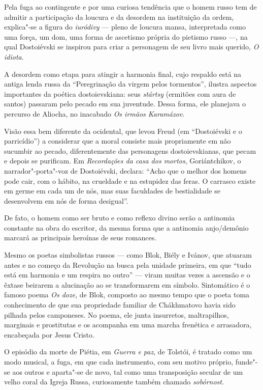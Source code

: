 Pela fuga ao contingente e por uma curiosa tendência que o homem russo
tem de admitir a participação da loucura e da desordem na instituição da
ordem, explica"-se a figura do \emph{iuródivy} --- pleno de loucura mansa,
interpretada como uma força, um dom, uma forma de ascetismo própria do
pietismo russo ---, na qual Dostoiévski se inspirou para criar a
personagem de seu livro mais querido, \emph{O idiota}.

A desordem como etapa para atingir a harmonia final, cujo respaldo está
na antiga lenda russa da ``Peregrinação da virgem pelos tormentos'',
ilustra aspectos importantes da poética dostoievskiana: seus
\emph{stártsy} (ermitões com aura de santos) passaram pelo pecado em sua
juventude. Dessa forma, ele planejava o percurso de Aliocha, no
inacabado \emph{Os irmãos Karamázov}.

Visão essa bem diferente da ocidental, que levou Freud
(em ``Dostoiévski e o parricídio'') a considerar que a moral consiste
mais propriamente em não sucumbir ao pecado, diferentemente das
personagens dostoievskianas, que pecam e depois se purificam.
Em \emph{Recordações da casa dos mortos}, Goriántchikov, o
narrador"-porta"-voz de Dostoiévski, declara: ``Acho que o melhor dos
homens pode cair, com o hábito, na crueldade e na estupidez das feras. O
carrasco existe em germe em cada um de nós, mas suas faculdades de
bestialidade se desenvolvem em nós de forma desigual''.

De fato, o homem como ser bruto e como reflexo divino serão a antinomia
constante na obra do escritor, da mesma forma que a antinomia
anjo/demônio marcará as principais heroínas de seus romances.

Mesmo os poetas simbolistas russos --- como Blok, Biély e Ivánov, que
atuaram antes e no começo da Revolução na busca pela unidade primeira,
em que ``tudo está em harmonia e um respira no outro'' --- viram muitas
vezes a ascensão e o êxtase beirarem a alucinação ao se transformarem em
símbolo. Sintomático é o famoso poema \emph{Os doze}, de Blok, composto
ao mesmo tempo que o poeta toma conhecimento de que sua propriedade
familiar de Chákhmatovo havia sido pilhada pelos camponeses. No poema,
ele junta insurretos, maltrapilhos, marginais e prostitutas e os
acompanha em uma marcha frenética e arrasadora, encabeçada por Jesus
Cristo.

O episódio da morte de Piétia, em \emph{Guerra e paz}, de Tolstói, é
tratado como um modo musical, a fuga, em que cada instrumento, com seu
motivo próprio, funde"-se aos outros e aparta"-se de novo, tal como uma
transposição secular de um velho coral da Igreja Russa, curiosamente
também chamado \emph{sobórnost}.

